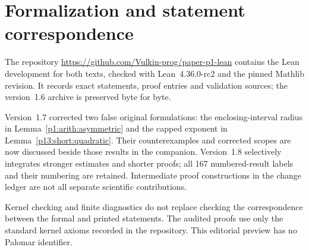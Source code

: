 \clearpage
\section*{Formalization and statement correspondence}
The repository \url{https://github.com/Vulkin-prog/paper-p1-lean}
contains the Lean development for both texts, checked with
Lean~4.36.0-rc2 and the pinned Mathlib revision.
It records exact statements, proof entries and validation sources;
the version~1.6 archive is preserved byte for byte.

Version~1.7 corrected two false original formulations:
the enclosing-interval radius in Lemma~\ref{p1:arith:asymmetric}
and the capped exponent in Lemma~\ref{p13:short:quadratic}.
Their counterexamples and corrected scopes are now discussed beside
those results in the companion. Version~1.8 selectively integrates
stronger estimates and shorter proofs; all 167 numbered-result labels
and their numbering are retained. Intermediate proof constructions
in the change ledger are not all separate scientific contributions.

Kernel checking and finite diagnostics do not replace checking
the correspondence between the formal and printed statements.
The audited proofs use only the standard kernel axioms recorded
in the repository. This editorial preview has no Palomar identifier.
